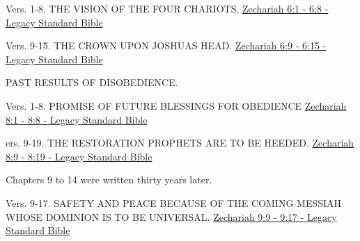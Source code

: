 \documentclass[
  ignorenonframetext,
]{beamer}
\begin{document}
\begin{frame}{6}
\label{section-139}
\begin{block}{Vers. 1-8. THE VISION OF THE FOUR CHARIOTS.}
\label{vers.-1-8.-the-vision-of-the-four-chariots.}
\href{https://read.lsbible.org/?q=zech6\%3A1-8}{Zechariah 6:1 - 6:8 -
Legacy Standard Bible}
\end{block}

\begin{block}{Vers. 9-15. THE CROWN UPON JOSHUA\textquotesingle S HEAD.}
\label{vers.-9-15.-the-crown-upon-joshuas-head.}
\href{https://read.lsbible.org/?q=zech6\%3A9-15}{Zechariah 6:9 - 6:15 -
Legacy Standard Bible}
\end{block}
\end{frame}

\begin{frame}{7}
\label{section-140}
\begin{block}{PAST RESULTS OF DISOBEDIENCE.}
\label{past-results-of-disobedience.}
\end{block}
\end{frame}

\begin{frame}{8}
\label{section-141}
\begin{block}{Vers. 1-8. PROMISE OF FUTURE BLESSINGS FOR OBEDIENCE}
\label{vers.-1-8.-promise-of-future-blessings-for-obedience}
\href{https://read.lsbible.org/?q=zech8\%3A1-8}{Zechariah 8:1 - 8:8 -
Legacy Standard Bible}
\end{block}

\begin{block}{ers. 9-19. THE RESTORATION PROPHETS ARE TO BE HEEDED.}
\label{ers.-9-19.-the-restoration-prophets-are-to-be-heeded.}
\href{https://read.lsbible.org/?q=zech8\%3A9-19}{Zechariah 8:9 - 8:19 -
Legacy Standard Bible}
\end{block}
\end{frame}

\begin{frame}{9}
\label{section-142}
Chapters 9 to 14 were written thirty years later.

\begin{block}{Vers. 9-17. SAFETY AND PEACE BECAUSE OF THE COMING MESSIAH
WHOSE DOMINION IS TO BE UNIVERSAL.}
\label{vers.-9-17.-safety-and-peace-because-of-the-coming-messiah-whose-dominion-is-to-be-universal.}
\href{https://read.lsbible.org/?q=zech9\%3A9-17}{Zechariah 9:9 - 9:17 -
Legacy Standard Bible}
\end{block}
\end{frame}
\end{document}
